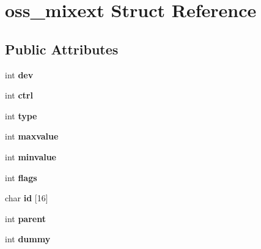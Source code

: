 \hypertarget{structoss__mixext}{}\section{oss\+\_\+mixext Struct Reference}
\label{structoss__mixext}
\subsection*{Public Attributes}
\begin{DoxyCompactItemize}
\item 
int {\bfseries dev}\hypertarget{structoss__mixext_abb27ead683d2da74e48bd21996bb1ba3}{}\label{structoss__mixext_abb27ead683d2da74e48bd21996bb1ba3}

\item 
int {\bfseries ctrl}\hypertarget{structoss__mixext_a96060a600727a67e064e1a6fc7923733}{}\label{structoss__mixext_a96060a600727a67e064e1a6fc7923733}

\item 
int {\bfseries type}\hypertarget{structoss__mixext_a7e3d12fcf83f3f8303e2c7a4d7fecd44}{}\label{structoss__mixext_a7e3d12fcf83f3f8303e2c7a4d7fecd44}

\item 
int {\bfseries maxvalue}\hypertarget{structoss__mixext_aa8377a8692e24d5d4fc4920882723adb}{}\label{structoss__mixext_aa8377a8692e24d5d4fc4920882723adb}

\item 
int {\bfseries minvalue}\hypertarget{structoss__mixext_ae592cf86825fc8577153689f4b34db5b}{}\label{structoss__mixext_ae592cf86825fc8577153689f4b34db5b}

\item 
int {\bfseries flags}\hypertarget{structoss__mixext_a3a07d9ba0a19b75dc463f489af738601}{}\label{structoss__mixext_a3a07d9ba0a19b75dc463f489af738601}

\item 
char {\bfseries id} \mbox{[}16\mbox{]}\hypertarget{structoss__mixext_a598ff809096b6c88157495417f05615c}{}\label{structoss__mixext_a598ff809096b6c88157495417f05615c}

\item 
int {\bfseries parent}\hypertarget{structoss__mixext_ae142f63a99232453828290316aca8bbf}{}\label{structoss__mixext_ae142f63a99232453828290316aca8bbf}

\item 
int {\bfseries dummy}\hypertarget{structoss__mixext_a7e9449ca3e0b5c4977e597f4fe4091f1}{}\label{structoss__mixext_a7e9449ca3e0b5c4977e597f4fe4091f1}


\end{DoxyCompactItemize}
